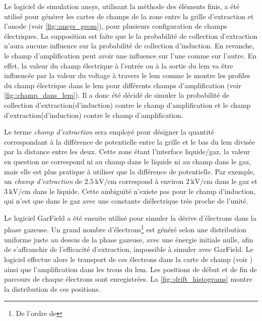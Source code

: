             Le logiciel de simulation \gls{ansys}, utilisant la méthode des éléments finis, a été utilisé pour générer les cartes de champs de la zone entre la grille d'extraction et l'anode (voir \autoref{fig::ansys_geom}), pour plusieurs configuration de champs électriques. La supposition est faite que le la probabilité de collection d'extraction n'aura aucune influence sur la probabilité de collection d'induction. En revanche, le champ d'amplification peut avoir une influence sur l'une comme sur l'autre. En effet, la valeur du champ électrique à l'entrée ou à la sortie du \gls{lem} va être influencée par la valeur du voltage à travers le \gls{lem} comme le montre les profiles du champ électrique dans le \gls{lem} pour différents champs d'amplification (voir \autoref{fig::champ_dans_lem}). Il a donc été décidé de simuler la probabilité de collection d'extraction(d'induction) contre le champ d'amplification et le champ d'extraction(d'induction) contre le champ d'amplification.
            
            Le terme \textit{champ d'extraction} sera employé pour désigner la quantité correspondant à la différence de potentielle entre la grille et le bas du \gls{lem} divisée par la distance entre les deux. Cette zone étant l'interface liquide/gaz, la valeur en question ne correspond ni au champ dans le liquide ni au champ dans le gaz, mais elle est plus pratique à utiliser que la différence de potentielle. Par exemple, un \textit{champ d'extraction} de $\SI{2.5}{\kilo\volt\per\centi\meter}$ correspond à environ $\SI{2}{\kilo\volt\per\centi\meter}$ dans le gaz et $\SI{3}{\kilo\volt\per\centi\meter}$ dans le liquide. Cette ambiguïté n'existe pas pour le champ d'induction, qui n'est que dans le gaz avec une constante diélectrique très proche de l'unité.
            
            Le logiciel GarField a été ensuite utilisé pour simuler la dérive d'électrons dans la phase gazeuse. Un grand nombre d'électrons\footnote{De l'ordre de } est généré selon une distribution uniforme juste au dessus de la phase gazeuse, avec une énergie initiale nulle, afin de s'affranchir de l'efficacité d'extraction, impossible à simuler avec GarField. Le logiciel effectue alors le transport de ces électrons dans la carte de champ (voir \cite{garfield}) ainsi que l'amplification dans les trous du \gls{lem}. Les positions de début et de fin de parcours de chaque électrons sont enregistrées. La \autoref{fig::drift_histograms} montre la distribution de ces positions.
            
